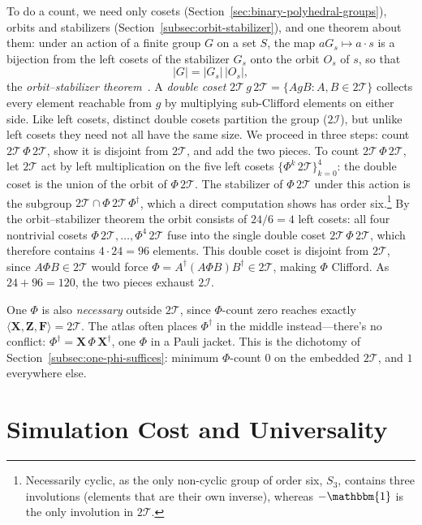 \documentclass[11pt, oneside, openany]{scrbook}
\newcommand{\Id}{\mathbbm{1}}
\newcommand{\Tgroup}{\mathcal{T}}  %
\newcommand{\Igroup}{\mathcal{I}}  %
\newcommand{\TwoT}{2\Tgroup}
\newcommand{\TwoI}{2\Igroup}
\begin{document}
To do a count, we need only cosets (Section~\ref{sec:binary-polyhedral-groups}), orbits and stabilizers (Section~\ref{subsec:orbit-stabilizer}), and one theorem about them: under an action of a finite group $G$ on a set $S$, the map $a G_s \mapsto a \cdot s$ is a bijection from the left cosets of the stabilizer $G_s$ onto the orbit $O_s$ of $s$, so that
$$ |G| = |G_s|\,|O_s|, $$
the \textit{orbit--stabilizer theorem}~\cite{artin2011algebra}. A \textit{double coset} $\TwoT\,g\,\TwoT = \{AgB : A, B \in \TwoT\}$ collects every element reachable from $g$ by multiplying sub-Clifford elements on either side. Like left cosets, distinct double cosets partition the group ($\TwoI$), but unlike left cosets they need not all have the same size. We proceed in three steps: count $\TwoT\,\Phi\,\TwoT$, show it is disjoint from $\TwoT$, and add the two pieces. To count $\TwoT\,\Phi\,\TwoT$, let $\TwoT$ act by left multiplication on the five left cosets $\{ \Phi^k\,\TwoT \}_{k=0}^{4}$: the double coset is the union of the orbit of $\Phi\,\TwoT$. The stabilizer of $\Phi\,\TwoT$ under this action is the subgroup $\TwoT \cap \Phi\,\TwoT\,\Phi^\dagger$, which a direct computation shows has order six.\footnote{Necessarily cyclic, as the only non-cyclic group of order six, $S_3$, contains three involutions (elements that are their own inverse), whereas $-\Id$ is the only involution in $\TwoT$.} By the orbit--stabilizer theorem the orbit consists of $24/6 = 4$ left cosets: all four nontrivial cosets $\Phi\,\TwoT, \dots, \Phi^4\,\TwoT$ fuse into the single double coset $\TwoT\,\Phi\,\TwoT$, which therefore contains $4 \cdot 24 = 96$ elements. This double coset is disjoint from $\TwoT$, since $A \Phi B \in \TwoT$ would force $\Phi = A^\dagger (A \Phi B) B^\dagger \in \TwoT$, making $\Phi$ Clifford. As $24 + 96 = 120$, the two pieces exhaust $\TwoI$.

One $\Phi$ is also \textit{necessary} outside $\TwoT$, since $\Phi$-count zero reaches exactly $\langle \mathbf{X}, \mathbf{Z}, \mathbf{F} \rangle = \TwoT$. The atlas often places $\Phi^\dagger$ in the middle instead---there's no conflict: $\Phi^\dagger = \mathbf{X}\,\Phi\,\mathbf{X}^\dagger$, one $\Phi$ in a Pauli jacket. This is the dichotomy of Section~\ref{subsec:one-phi-suffices}: minimum $\Phi$-count $0$ on the embedded $\TwoT$, and $1$ everywhere else. %

\section{Simulation Cost and Universality} \label{sec:synthesis:cost}
\end{document}
